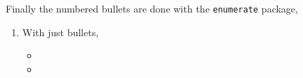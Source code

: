 \documentclass{homework}
\begin{document}
\begin{question}
Finally the numbered bullets are done with the \texttt{enumerate} package,

\begin{enumerate}
  \item With just bullets,
  \begin{itemize}
    \item {}
    \item {}
  \end{itemize}
\end{enumerate}
\end{question}

\end{document}
